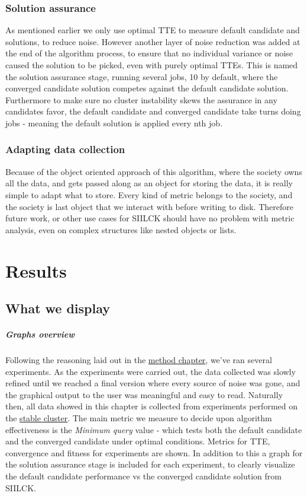 \documentclass[a4paper,english]{report}
\begin{document}
			\subsection{Solution assurance}
			As mentioned earlier we only use optimal TTE to measure default candidate and solutions, to reduce noise. However another layer of noise reduction was added at the end of the algorithm process, to ensure that no individual variance or noise caused the solution to be picked, even with purely optimal TTEs. This is named the solution assurance stage, running several jobs, 10 by default, where the converged candidate solution competes against the default candidate solution. Furthermore to make sure no cluster instability skews the assurance in any candidates favor, the default candidate and converged candidate take turns doing jobs - meaning the default solution is applied every nth job.
			\subsection{Adapting data collection}
			Because of the object oriented approach of this algorithm, where the society owns all the data, and gets passed along as an object for storing the data, it is really simple to adapt what to store. Every kind of metric belongs to the society, and the society is last object that we interact with before writing to disk. Therefore future work, or other use cases for SIILCK should have no problem with metric analysis, even on complex structures like nested objects or lists.
			
	\chapter{Results}
	\label{chap:results}
	\section{What we display}
	\paragraph{Graphs overview}
	Following the reasoning laid out in the \hyperref[chap:method]{method chapter}, we've ran several experiments. As the experiments were carried out, the data collected was slowly refined until we reached a final version where every source of noise was gone, and the graphical output to the user was meaningful and easy to read. Naturally then, all data showed in this chapter is collected from experiments performed on the \hyperref[table:cluster_stable]{stable cluster}. The main metric we measure to decide upon algorithm effectiveness is the \textit{Minimum query} value - which tests both the default candidate and the converged candidate under optimal conditions. Metrics for TTE, convergence and fitness for experiments are shown. In addition to this a graph for the solution assurance stage is included for each experiment, to clearly visualize the default candidate performance vs the converged candidate solution from SIILCK.
\end{document}
